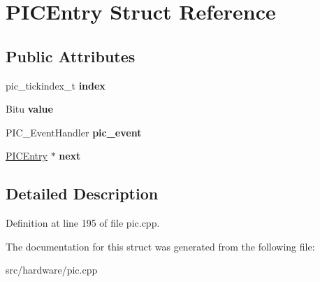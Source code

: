\hypertarget{structPICEntry}{\section{P\-I\-C\-Entry Struct Reference}
\label{structPICEntry}
}
\subsection*{Public Attributes}
\begin{DoxyCompactItemize}
\item 
\hypertarget{structPICEntry_a6253dbeb4602fe1c76213bc9dcfc6f82}{pic\-\_\-tickindex\-\_\-t {\bfseries index}}\label{structPICEntry_a6253dbeb4602fe1c76213bc9dcfc6f82}

\item 
\hypertarget{structPICEntry_aa24da36d5183c48d36d262f9861b1371}{Bitu {\bfseries value}}\label{structPICEntry_aa24da36d5183c48d36d262f9861b1371}

\item 
\hypertarget{structPICEntry_a1d7e2902f11b356f977faaf6e8f9a5c3}{P\-I\-C\-\_\-\-Event\-Handler {\bfseries pic\-\_\-event}}\label{structPICEntry_a1d7e2902f11b356f977faaf6e8f9a5c3}

\item 
\hypertarget{structPICEntry_a45ff9b7aee4f5401e5d79b0595d818e4}{\hyperlink{structPICEntry}{P\-I\-C\-Entry} $\ast$ {\bfseries next}}\label{structPICEntry_a45ff9b7aee4f5401e5d79b0595d818e4}

\end{DoxyCompactItemize}


\subsection{Detailed Description}


Definition at line 195 of file pic.\-cpp.



The documentation for this struct was generated from the following file\-:\begin{DoxyCompactItemize}
\item 
src/hardware/pic.\-cpp\end{DoxyCompactItemize}

